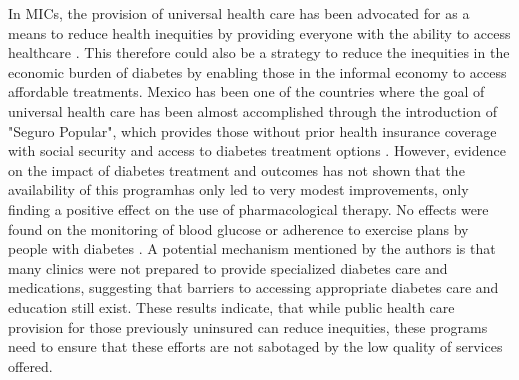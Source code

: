 In \acp{MIC}, the provision of universal health care has been advocated for as a means to reduce health inequities by providing everyone with the ability to access healthcare \parencite{Marmot2008}. This therefore could also be a strategy to reduce the inequities in the economic burden of diabetes by enabling those in the informal economy to access affordable treatments.  Mexico has been one of the countries where the goal of universal health care has been almost accomplished through the introduction of "Seguro Popular", which provides those without prior health insurance coverage with social security and access to diabetes treatment options \parencite{Knaul2012,Rivera-Hernandez2016}. However, evidence on the impact of diabetes treatment and outcomes has not shown that the availability of this programhas only led to very modest improvements, only finding a positive effect on the use of pharmacological therapy. No effects were found on the monitoring of blood glucose or adherence to exercise plans by people with diabetes \parencite{Rivera-Hernandez2016}. A potential mechanism mentioned by the authors is that many clinics were not prepared to provide specialized diabetes care and medications, suggesting that barriers to accessing appropriate diabetes care and education still exist. These results indicate, that while public health care provision for those previously uninsured can reduce inequities, these programs need to ensure that these efforts are not sabotaged by the low quality of services offered.

